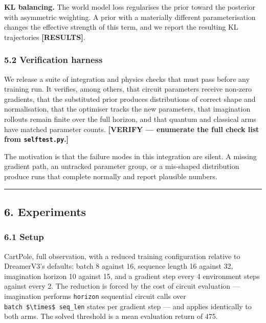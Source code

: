 \documentclass[
  11pt]{article}
\begin{document}
\textbf{KL balancing.} The world model loss regularises the prior toward
the posterior with asymmetric weighting. A prior with a materially
different parameterisation changes the effective strength of this term,
and we report the resulting KL trajectories \textbf{{[}RESULTS{]}}.

\hypertarget{verification-harness}{%
\subsubsection{5.2 Verification harness}\label{verification-harness}}

We release a suite of integration and physics checks that must pass
before any training run. It verifies, among others, that circuit
parameters receive non-zero gradients, that the substituted prior
produces distributions of correct shape and normalisation, that the
optimiser tracks the new parameters, that imagination rollouts remain
finite over the full horizon, and that quantum and classical arms have
matched parameter counts. \textbf{{[}VERIFY --- enumerate the full check
list from \texttt{selftest.py}.{]}}

The motivation is that the failure modes in this integration are silent.
A missing gradient path, an untracked parameter group, or a mis-shaped
distribution produce runs that complete normally and report plausible
numbers.

\begin{center}\rule{0.5\linewidth}{0.5pt}\end{center}

\hypertarget{experiments}{%
\subsection{6. Experiments}\label{experiments}}

\hypertarget{setup}{%
\subsubsection{6.1 Setup}\label{setup}}

CartPole, full observation, with a reduced training configuration
relative to DreamerV3's defaults: batch 8 against 16, sequence length 16
against 32, imagination horizon 10 against 15, and a gradient step every
4 environment steps against every 2. The reduction is forced by the cost
of circuit evaluation --- imagination performs \texttt{horizon}
sequential circuit calls over
\texttt{batch\ \$\textbackslash{}times\$\ seq\_len} states per gradient
step --- and applies identically to both arms. The solved threshold is a
mean evaluation return of 475.
\end{document}
